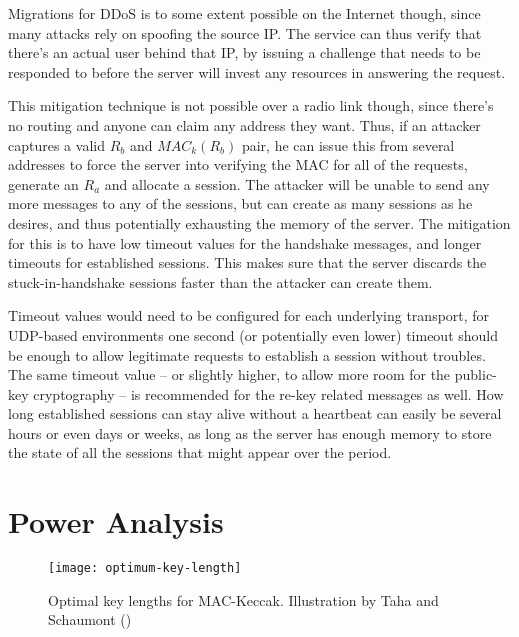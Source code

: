 Migrations for DDoS is to some extent possible on the Internet though, since many attacks rely on spoofing the source IP. The service can thus verify that there's an actual user behind that IP, by issuing a challenge that needs to be responded to before the server will invest any resources in answering the request.

This mitigation technique is not possible over a radio link though, since there's no routing and anyone can claim any address they want. Thus, if an attacker captures a valid $R_b$ and \( MAC_k(R_b) \) pair, he can issue this from several addresses to force the server into verifying the MAC for all of the requests, generate an $R_a$ and allocate a session. The attacker will be unable to send any more messages to any of the sessions, but can create as many sessions as he desires, and thus potentially exhausting the memory of the server. The mitigation for this is to have low timeout values for the handshake messages, and longer timeouts for established sessions. This makes sure that the server discards the stuck-in-handshake sessions faster than the attacker can create them.

Timeout values would need to be configured for each underlying transport, for UDP-based environments one second (or potentially even lower) timeout should be enough to allow legitimate requests to establish a session without troubles. The same timeout value -- or slightly higher, to allow more room for the public-key cryptography -- is recommended for the re-key related messages as well. How long established sessions can stay alive without a heartbeat can easily be several hours or even days or weeks, as long as the server has enough memory to store the state of all the sessions that might appear over the period.


\section{Power Analysis}

\begin{figure}[ht!]
\centering
    \texttt{[image: optimum-key-length]}
    \caption{Optimal key lengths for MAC-Keccak. Illustration by Taha and Schaumont (\cite{keccak_side_channel_analysis})}\label{fig:optimum-key-length}
\end{figure}

